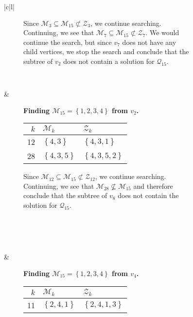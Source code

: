 \begin{figure}[ht!]
\begin{tabular}[t]{|c|l|}
\begin{subfigure}[b]{0.64\textwidth}
        Since $\mathcal{M}_3 \subseteq \mathcal{M}_{15} \not \subset
        \mathcal{Z}_3$, we continue searching. Continuing, we see that
        $\mathcal{M}_7 \subseteq \mathcal{M}_{15} \not \subset \mathcal{Z}_7$.
        We would continue the search, but since $v_7$ does not have any child
        vertices, we stop the search and conclude that the subtree of $v_2$
        does not contain a solution for $\mathcal{Q}_{15}$.
        \\
    \end{subfigure}
    \\ \hline
    \begin{subfigure}[b]{0.35\textwidth}
        \centering
        
    \end{subfigure}
    & 
    \begin{subfigure}[b]{0.64\textwidth}
        \textbf{Finding $\mathcal{M}_{15} = \left\{{1,2,3,4}\right\}$ from $v_2$.} \\
        \begin{tabular}{rll}
            $k$ & $\mathcal{M}_k$            & $\mathcal{Z}_k$ \\ \hline
            12        & $\left\{{4,3}\right\}$     & $\left\{{4,3,1}\right\}$ \\ 
            28        & $\left\{{4,3,5}\right\}$   & $\left\{{4,3,5,2}\right\}$ \\ 
        \end{tabular}

        Since $\mathcal{M}_{12} \subseteq \mathcal{M}_{15} \not \subset
        \mathcal{Z}_{12}$, we continue searching. Continuing, we see that
        $\mathcal{M}_{28} \not \subseteq \mathcal{M}_{15}$ and therefore
        conclude that the subtree of $v_8$ does not contain the solution for
        $\mathcal{Q}_{15}$.
        \\
        \\
        \\
    \end{subfigure}
    \\ \hline
    \begin{subfigure}[b]{0.35\textwidth}
        \centering
        
    \end{subfigure}
    & 
    \begin{subfigure}[b]{0.64\textwidth}
        \textbf{Finding $\mathcal{M}_{15} = \left\{{1,2,3,4}\right\}$ from $v_4$.} \\
        \begin{tabular}{rll}
            $k$ & $\mathcal{M}_k$            & $\mathcal{Z}_k$ \\ \hline
            11        & $\left\{{2,4,1}\right\}$   & $\left\{{2,4,1,3}\right\}$ \\ 
        \end{tabular}


\end{subfigure}
\end{tabular}
\end{figure}
